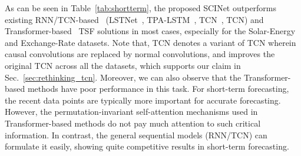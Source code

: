 \documentclass{article}
\begin{document}
As can be seen in Table~\ref{tab:shortterm}, the proposed SCINet outperforms existing RNN/TCN-based~ (LSTNet~\citep{Lai2018ModelingLA}, TPA-LSTM~\citep{Shih2019TemporalPA}, TCN~\citep{Bai2018AnEE}, TCN) and Transformer-based~\citep{Wu2021AutoformerDT, Zhou2020InformerBE, vaswani2017attention} TSF solutions in most cases, especially for the Solar-Energy and Exchange-Rate datasets. 
Note that, TCN denotes a variant of TCN wherein causal convolutions are replaced by normal convolutions, and improves the original TCN across all the datasets, which supports our claim in Sec.~\ref{sec:rethinking_tcn}. 
Moreover, we can also observe that the Transformer-based methods have poor performance in this task. 
For short-term forecasting, the recent data points 
are typically more important for accurate forecasting. However, the permutation-invariant self-attention mechanisms used in Transformer-based methods do not pay much attention to such critical information. In contrast, the general sequential models (RNN/TCN) can formulate it easily, showing quite competitive results in short-term forecasting. 
\end{document}
